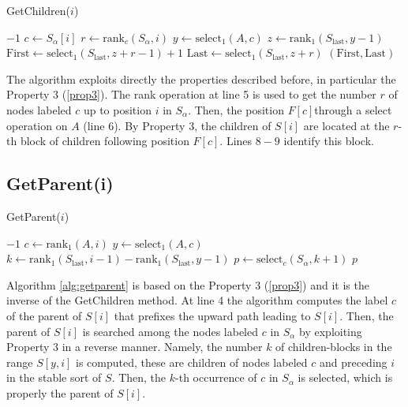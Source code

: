\begin{algorithm}[H]
    \caption{GetChildren($i$)}
    \begin{algorithmic}[1]
        \State \Return $-1$ 
    \EndIf
    \State $c \gets S_\alpha[i]$ 
    \State $r \gets \text{rank}_c(S_\alpha, i)$
    \State $y \gets \text{select}_1(A, c)$ 
    \State $z \gets \text{rank}_1(S_{\text{last}}, y - 1)$
    \State $\text{First} \gets \text{select}_1(S_{\text{last}}, z + r - 1) + 1$
    \State $\text{Last} \gets \text{select}_1(S_{\text{last}}, z + r)$
    \State \Return $(\text{First}, \text{Last})$
    \end{algorithmic}
\end{algorithm}

The algorithm exploits directly the properties described before, in particular the Property 3 (\ref{prop3}). The rank operation at line 5 is used to get the number $r$ of nodes labeled $c$ up to position $i$ in $S_{\alpha}$. Then, the position $F[c] $through a select operation on $A$ (line 6). By Property 3, the children of $S[i]$ are located at the $r$-th block of children following position $F[c]$. Lines $8 - 9$ identify this block. 

\subsection*{GetParent(i)}

\begin{algorithm}[H]
    \caption{GetParent($i$)}
    \label{alg:getparent}
    \begin{algorithmic}[1]
        \State \Return $-1$ 
    \EndIf
    \State $c \gets \text{rank}_1(A, i)$
    \State $y \gets \text{select}_1(A, c)$
    \State $k \gets \text{rank}_1(S_{\text{last}}, i - 1) - \text{rank}_1(S_{\text{last}}, y - 1)$
    \State $p \gets \text{select}_c(S_\alpha, k + 1)$
    \State \Return $p$
    \end{algorithmic}
\end{algorithm}

Algorithm \ref{alg:getparent} is based on the Property 3 (\ref{prop3}) and it is the inverse of the GetChildren method. At line 4 the algorithm computes the label $c$ of the parent of $S[i]$ that prefixes the upward path leading to $S[i]$. Then, the parent of $S[i]$ is searched among the nodes labeled $c$ in $S_{\alpha}$ by exploiting Property 3 in a reverse manner. Namely, the number $k$ of children-blocks in the range $S[y, i]$ is computed, these are children of nodes labeled $c$ and preceding $i$ in the stable sort of $S$. Then, the $k$-th occurrence of $c$ in $S_{\alpha}$ is selected, which is properly the parent of $S[i]$.

